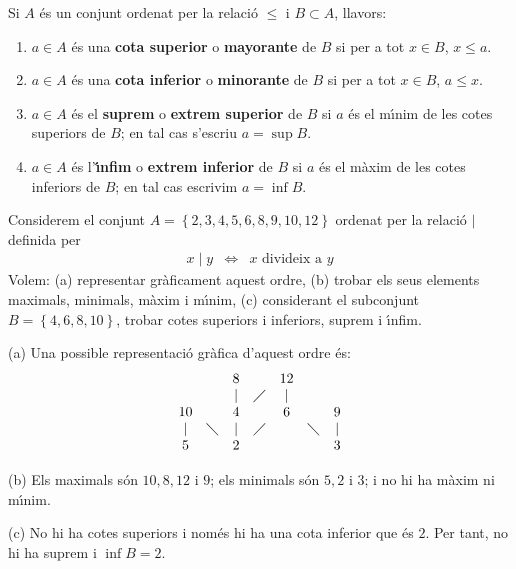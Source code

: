 Si $A$ \'{e}s un conjunt ordenat per la relaci\'{o} $\leq$ i $B\subset A$,
llavors:

\begin{enumerate}
\item $a\in A$ \'{e}s una \textbf{cota superior} o \textbf{mayorante} de $B$
si per a tot $x\in B$, $x\leq a$.

\item $a\in A$ \'{e}s una \textbf{cota inferior} o \textbf{minorante} de $B$
si per a tot $x\in B$, $a\leq x$.

\item $a\in A$ \'{e}s el \textbf{suprem} o \textbf{extrem superior} de $B$
si $a$ \'{e}s el m\'{\i}nim de les cotes superiors de $B$; en tal cas
s'escriu $a=\sup B$.

\item $a\in A$ \'{e}s l'\textbf{\'{\i}nfim} o \textbf{extrem inferior} de $B$
si $a$ \'{e}s el m\`{a}xim de les cotes inferiors de $B$; en tal cas
escrivim $a=\inf B$.
\end{enumerate}

\begin{exem}
Considerem el conjunt $A=\left\{ 2,3,4,5,6,8,9,10,12\right\} $ ordenat per
la relaci\'{o} $\mid$ definida per%
\begin{equation*}
\begin{array}{ccc}
x\mid y & \Longleftrightarrow & x\text{ divideix a }y%
\end{array}
\end{equation*}
Volem: (a) representar gr\`{a}ficament aquest ordre, (b) trobar els seus
elements maximals, minimals, m\`{a}xim i m\'{\i}nim, (c) considerant el
subconjunt $B=\left\{ 4,6,8,10\right\} $, trobar cotes superiors i
inferiors, suprem i \'{\i}nfim.
\end{exem}

\begin{solucio}
(a) Una possible representaci\'{o} gr\`{a}fica d'aquest ordre \'{e}s:%
\begin{equation*}
\begin{array}{ccccccc}
&  & 8 &  & 12 &  &  \\
&  & \mid & \diagup & \mid &  &  \\
10 &  & 4 &  & 6 &  & 9 \\
\mid & \diagdown & \mid & \diagup &  & \diagdown & \mid \\
5 &  & 2 &  &  &  & 3%
\end{array}
\end{equation*}

(b) Els maximals s\'{o}n $10,8,12$ i $9$; els minimals s\'{o}n $5,2$ i $3$;
i no hi ha m\`{a}xim ni m\'{\i}nim.

(c) No hi ha cotes superiors i nom\'{e}s hi ha una cota inferior que \'{e}s $%
2$. Per tant, no hi ha suprem i $\inf B=2$.
\end{solucio}

